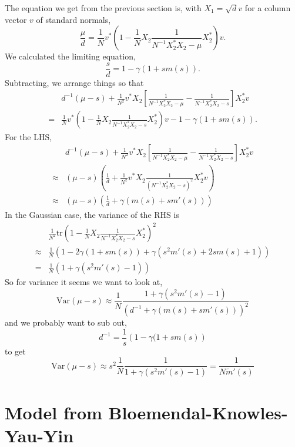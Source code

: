 \documentclass[11 pt, reqno]{article}
\def\beq{\begin{equation}}
\def\eeq{\end{equation}}
\def\tr{\mathrm{tr}}
\begin{document}
The equation we get from the previous section is, with $X_1 = \sqrt{d} v$ for a column vector $v$ of standard normals,
\beq
\frac{\mu}{d} = \frac{1}{N} v^* \left( 1 - \frac{1}{N} X_2 \frac{1}{ N^{-1} X_2^* X_2 - \mu } X_2^* \right) v.
\eeq
We calculated the limiting equation,
\beq
\frac{s}{d}  = 1 - \gamma(1 + s m (s) ).
\eeq
Subtracting, we arrange things so that
\begin{align}
& d^{-1} ( \mu - s ) + \frac{1}{N^2} v^* X_2 \left[ \frac{1}{ N^{-1} X_2^* X_2 - \mu } - \frac{1}{ N^{-1} X_2^* X_2 - s } \right] X_2^* v \\
=& \frac{1}{N} v^* \left( 1 - \frac{1}{N} X_2 \frac{1}{ N^{-1} X_2^* X_2 - s } X_2^* \right) v - 1 - \gamma ( 1 + s m (s) ).
\end{align}
For the LHS,
\begin{align}
&d^{-1} ( \mu - s ) + \frac{1}{N^2} v^* X_2 \left[ \frac{1}{ N^{-1} X_2^* X_2 - \mu } - \frac{1}{ N^{-1} X_2^* X_2 - s } \right] X_2^* v \\
\approx & ( \mu - s) \left( \frac{1}{d} + \frac{1}{N^2} v^* X_2 \frac{1}{ ( N^{-1} X_2^* X_2 - s )^2 } X_2^* v \right) \\
\approx & ( \mu - s ) \left( \frac{1}{d} + \gamma ( m ( s ) + s m' (s) ) \right)
\end{align}
In the Gaussian case, the variance of the RHS is
\begin{align}
& \frac{1}{N^2} \tr  \left( 1 - \frac{1}{N} X_2 \frac{1}{ N^{-1} X_2^* X_2 - s } X_2^* \right)^2 \\
\approx & \frac{1}{N} \left( 1 - 2\gamma(1 + s m (s) ) + \gamma ( s^2 m' (s) + 2 s m (s) + 1 ) \right) \\
= & \frac{1}{N} \left( 1+ \gamma(s^2 m' (s) -1) \right)
\end{align}
So for variance it seems we want to look at,
\beq
\mathrm{Var} (\mu - s) \approx \frac{1}{N} \frac{ 1 + \gamma (s^2 m' (s) - 1) }{ ( d^{-1} + \gamma (m(s) + s m' (s) ) )^2 }
\eeq
and we probably want to sub out,
\beq
d^{-1}  =\frac{1}{s} \left( 1 - \gamma (1 + s m (s) \right)
\eeq
to get
\beq
\mathrm{Var} ( \mu - s) \approx s^2 \frac{1}{N} \frac{1}{ 1 + \gamma (s^2 m'(s) -1 )} = \frac{1}{N \tilde{m}' (s) }
\eeq




\section{Model from Bloemendal-Knowles-Yau-Yin}
\end{document}
